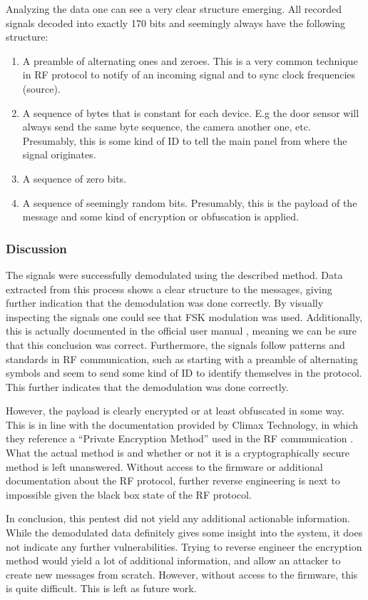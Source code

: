 Analyzing the data one can see a very clear structure emerging. All recorded signals decoded into exactly 170 bits and seemingly always have the following structure:
\begin{enumerate}
    \item A preamble of alternating ones and zeroes. This is a very common technique in RF protocol to notify of an incoming signal and to sync clock frequencies (\todo source).
    \item A sequence of bytes that is constant for each device. E.g the door sensor will always send the same byte sequence, the camera another one, etc. Presumably, this is some kind of ID to tell the main panel from where the signal originates.
    \item A sequence of zero bits.
    \item A sequence of seemingly random bits. Presumably, this is the payload of the message and some kind of encryption or obfuscation is applied.
\end{enumerate}

\subsubsection{Discussion}
The signals were successfully demodulated using the described method. Data extracted from this process shows a clear structure to the messages, giving further indication that the demodulation was done correctly. By visually inspecting the signals one could see that FSK modulation was used. Additionally, this is actually documented in the official user manual \cite{hsgw-user-manual}, meaning we can be sure that this conclusion was correct. Furthermore, the signals follow patterns and standards in RF communication, such as starting with a preamble of alternating symbols and seem to send some kind of ID to identify themselves in the protocol. This further indicates that the demodulation was done correctly.

However, the payload is clearly encrypted or at least obfuscated in some way. This is in line with the documentation provided by Climax Technology, in which they reference a \enquote{Private Encryption Method} used in the RF communication \cite{hsgw-user-manual}. What the actual method is and whether or not it is a cryptographically secure method is left unanswered. Without access to the firmware or additional documentation about the RF protocol, further reverse engineering is next to impossible given the black box state of the RF protocol.

In conclusion, this pentest did not yield any additional actionable information. While the demodulated data definitely gives some insight into the system, it does not indicate any further vulnerabilities. Trying to reverse engineer the encryption method would yield a lot of additional information, and allow an attacker to create new messages from scratch. However, without access to the firmware, this is quite difficult. This is left as future work.
